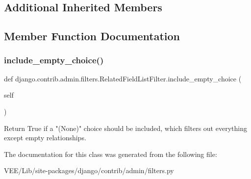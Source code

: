 \subsection*{Additional Inherited Members}


\subsection{Member Function Documentation}
\mbox{\label{classdjango_1_1contrib_1_1admin_1_1filters_1_1_related_field_list_filter_af042307a1c135a6461c06b481bce13ce}} 
\subsubsection{\texorpdfstring{include\+\_\+empty\+\_\+choice()}{include\_empty\_choice()}}
{\footnotesize\ttfamily def django.\+contrib.\+admin.\+filters.\+Related\+Field\+List\+Filter.\+include\+\_\+empty\+\_\+choice (\begin{DoxyParamCaption}\item[{}]{self }\end{DoxyParamCaption})}

\begin{DoxyVerb}Return True if a "(None)" choice should be included, which filters
out everything except empty relationships.
\end{DoxyVerb}
 

The documentation for this class was generated from the following file\+:\begin{DoxyCompactItemize}
\item 
V\+E\+E/\+Lib/site-\/packages/django/contrib/admin/filters.\+py\end{DoxyCompactItemize}
